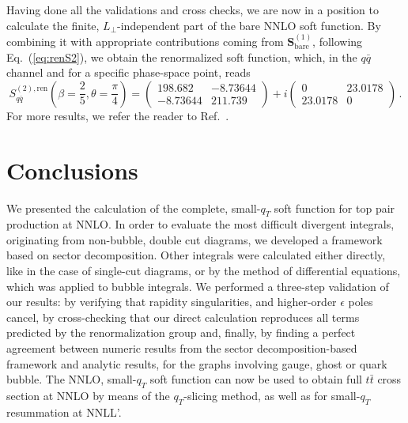 \documentclass{PoS}
\newcommand{\LT}{L_\perp}
\newcommand{\bfS}{\bm{S}}
\newcommand{\bare}{\text{bare}}
\begin{document}
Having done all the validations and cross checks, we are now in a position to
calculate the finite, $\LT$-independent part of the bare NNLO soft function.
By combining it with appropriate contributions coming from $\bfS^{(1)}_\bare$,
following Eq.~(\ref{eq:renS2}),
we obtain the renormalized soft function, which, in the $q\bar q$ channel and
for a specific phase-space point, reads
%
\begin{equation}
  S^{(2),\text{ren}}_{q\bar q} 
  \left(\beta = \frac{2}{5}, \theta = \frac{\pi}{4}\right) =  
  \left(
    \begin{array}{cc}
        198.682  & -8.73644 \\
        -8.73644 &  211.739
    \end{array}
  \right)
  +
  i \left(
    \begin{array}{cc}
        0        &  23.0178  \\
        23.0178  &  0 
    \end{array}
  \right)\,.
\end{equation}
%
For more results, we refer the reader to Ref.~\cite{sfpaper}.

\section{Conclusions}

We presented the calculation of the complete, small-$q_T$ soft function for top
pair production at NNLO. In order to evaluate the most difficult divergent
integrals, originating from non-bubble, double cut diagrams, we developed a
framework based on sector decomposition. Other integrals were calculated either
directly, like in the case of single-cut diagrams, or by the method of
differential equations, which was applied to bubble integrals.
%
We performed a three-step validation of our results: by verifying that rapidity
singularities, and higher-order $\epsilon$ poles cancel, by cross-checking that
our direct calculation reproduces all terms predicted by the renormalization
group and, finally, by finding a perfect agreement between numeric results from
the sector decomposition-based framework and analytic results, for the graphs
involving gauge, ghost or quark bubble.
%
The NNLO, small-$q_T$ soft function  can now be used to obtain full $t\bar t$
cross section at NNLO by means of the $q_T$-slicing method, as well as for
small-$q_T$ resummation at NNLL'.
\end{document}
